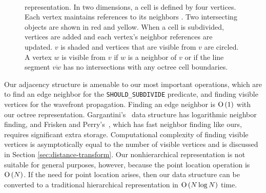 \documentclass{egpubl}
\begin{document}
\begin{figure}
  \centering
  \begin{minipage}{0.5\columnwidth}
     \\
  \end{minipage}
  \hfill
  \begin{minipage}{0.43\columnwidth}
\end{minipage}
  \caption{ representation.
    \protect{} In two dimensions, a  cell is defined by four vertices.  Each vertex maintains references to its neighbors .  Two intersecting objects are shown in red and yellow.
    \protect{} When a cell is subdivided, vertices are added and each vertex's neighbor references are updated.
    \protect{} $v$ is shaded and vertices that are visible from $v$ are circled.  A vertex $w$ is visible from $v$ if $w$ is a neighbor of $v$ or if the line segment $\overline{vw}$ has no intersections with any octree cell boundaries.}
  \label{fig:2d-octree-diagram}
\end{figure}

Our adjacency structure is amenable to our most important operations, which are to find an edge neighbor for the \texttt{SHOULD\_SUBDIVIDE} predicate, and finding visible vertices for the wavefront propagation.  Finding an edge neighbor is $\operatorname{O}\left(1\right)$ with our octree representation.  Gargantini's~ data structure has logarithmic neighbor finding, and Frisken and Perry's~, which has fast neighbor finding like ours, requires significant extra storage.  Computational complexity of finding visible vertices is asymptotically equal to the number of visible vertices and is discussed in Section \ref{sec:distance-transform}.  Our nonhierarchical representation is not suitable for general purposes, however, because the point location operation is $\operatorname{O}\left(N\right)$.  If the need for point location arises, then our data structure can be converted to a traditional hierarchical representation in $\operatorname{O}\left(N\log{N}\right)$ time.
\end{document}
